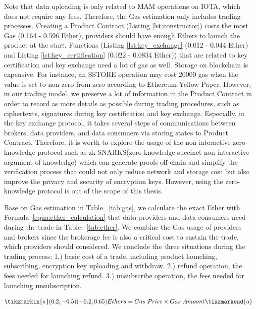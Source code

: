 \begin{spacing}{2.0}
Note that data uploading is only related to MAM operations on IOTA, which does not require any fees. Therefore, the Gas estimation only includes trading processes. Creating a Product Contract (Listing \ref{lst:constructor}) costs the most Gas (0.164 - 0.596 Ether), providers should have enough Ethers to launch the product at the start. Functions (Listing \ref{lst:key_exchange} (0.012 - 0.044 Ether) and Listing \ref{lst:key_certification} (0.022 - 0.0834 Ether)) that are related to key certification and key exchange need a lot of gas as well. Storage on blockchain is expensive. For instance, an SSTORE operation may cost 20000 gas when the value is set to non-zero from zero according to Ethereum Yellow Paper\cite{Ethereum}. However, in our trading model, we preserve a lot of information in the Product Contract in order to record as more details as possible during trading procedures, such as ciphertexts,  signatures during key certification and key exchange. Especially, in the key exchange protocol, it takes several steps of communications between brokers, data providers, and data consumers via storing states to Product Contract. Therefore, it is worth to explore the usage of the non-interactive zero-knowledge protocol such as zk-SNARKS(zero-knowledge succinct non-interactive argument of knowledge)\cite{Snark} which can generate proofs off-chain and simplify the verification process that could not only reduce network and storage cost but also improve the privacy and security of encryption keys. However, using the zero-knowledge protocol is out of the scope of this thesis.

Base on Gas estimation in Table.~\ref{tab:gas}, we calculate the exact Ether with Formula~\ref{equa:ether_calculation} that data providers and data consumers need during the trade in Table.~\ref{tab:ether}. We combine the Gas usage of providers and brokers since the brokerage fee is also a critical cost to sustain the trade, which providers should considered. We conclude the three situations during the trading process: 1.) basic cost of a trade, including product launching, subscribing, encryption key uploading and withdraw. 2.) refund operation, the fees needed for launching refund. 3.) unsubscribe operation, the fees needed for launching unsubscription.

\begin{equation}\tikzmarkin{a}(0.2,-0.5)(-0.2,0.65)
\label{equa:ether_calculation}
Ethers = Gas \ Price \times Gas \ Amount
\tikzmarkend{a}
\end{equation}


\end{spacing}
